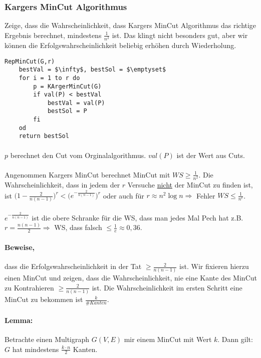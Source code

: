\subsubsection{Kargers MinCut Algorithmus}
Zeige, dass die Wahrscheinlichkeit, dass Kargers MinCut Algorithmus das richtige Ergebnis berechnet, mindestens $\frac{1}{n^2}$ ist. Das klingt nicht besonders gut, aber wir können die Erfolgswahrscheinlichkeit beliebig erhöhen durch Wiederholung.

\begin{lstlisting}[mathescape]
RepMinCut(G,r)
	bestVal = $\infty$, bestSol = $\emptyset$
	for i = 1 to r do
		p = KArgerMinCut(G)
		if val(P) < bestVal
			bestVal = val(P)
			bestSol = P
		fi
	od
	return bestSol
\end{lstlisting}
\paragraph*{} $p$ berechnet den Cut vom Orginalalgorithmus. $val(P)$ ist der Wert aus Cuts.

\paragraph*{} Angenommen Kargers MinCut berechnet MinCut mit $WS \geq \frac{1}{n^2}$. Die Wahrscheinlichkeit, dass in jedem der $r$ Versuche \underline{nicht} der MinCut zu finden ist, ist $\big(1-\frac{2}{n(n-1)}\big)^r < \big(e^{-\frac{2}{n(n-1)}}\big)^r$ oder auch für $r \approx n^2 \log n \Rightarrow $ Fehler $WS \leq \frac{1}{n^c}$.

\paragraph*{} $e^{-\frac{2}{n(n-1)}}$ ist die obere Schranke für die WS, dass man jedes Mal Pech hat z.B. $r=\frac{n(n-1)}{2} \Rightarrow$ WS, dass falsch $\leq \frac{1}{e} \approx 0,36$.

\paragraph*{Beweise,} dass die Erfolgswahrscheinlichkeit in der Tat $\geq \frac{2}{n(n-1)}$ ist. Wir fixieren hierzu einen MinCut und zeigen, dass die Wahrscheinlichkeit, nie eine Kante des MinCut zu Kontrahieren $\geq \frac{2}{n(n-1)}$ ist.
Die Wahrscheinlichkeit im ersten Schritt eine MinCut zu bekommen ist $\frac{k}{\#Kanten}$.

\paragraph*{Lemma:} Betrachte einen Multigraph $G(V,E)$ mir einem MinCut mit Wert $k$. Dann gilt: $G$ hat mindestens $\frac{k \cdot n}{2}$ Kanten.

